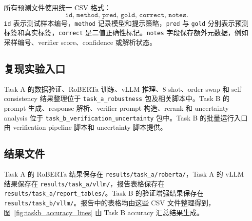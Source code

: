 所有预测文件使用统一 CSV 格式：
\[
\texttt{id, method, pred, gold, correct, notes}.
\]
\texttt{id} 表示测试样本编号，\texttt{method} 记录模型和提示策略，\texttt{pred} 与 \texttt{gold} 分别表示预测标签和真实标签，\texttt{correct} 是二值正确性标记。\texttt{notes} 字段保存额外元数据，例如采样编号、verifier score、confidence 或解析状态。

\subsection{复现实验入口}

Task A 的数据验证、RoBERTa 训练、vLLM 推理、8-shot、order swap 和 self-consistency 结果整理位于 \texttt{task\_a\_robustness} 包及相关脚本中。Task B 的 prompt 生成、response 解析、verifier prompt 构造、rerank 和 uncertainty analysis 位于 \texttt{task\_b\_verification\_uncertainty} 包中。Task B 的批量运行入口由 verification pipeline 脚本和 uncertainty 脚本提供。

\subsection{结果文件}

Task A 的 RoBERTa 结果保存在 \texttt{results/task\_a/roberta/}，Task A 的 vLLM 结果保存在 \texttt{results/task\_a/vllm/}，报告表格保存在 \texttt{results/task\_a/report\_tables/}。Task B 的验证增强结果保存在 \texttt{results/task\_b/vllm/}。报告中的表格均由这些 CSV 文件整理得到，图~\ref{fig:taskb_accuracy_lines} 由 Task B accuracy 汇总结果生成。

